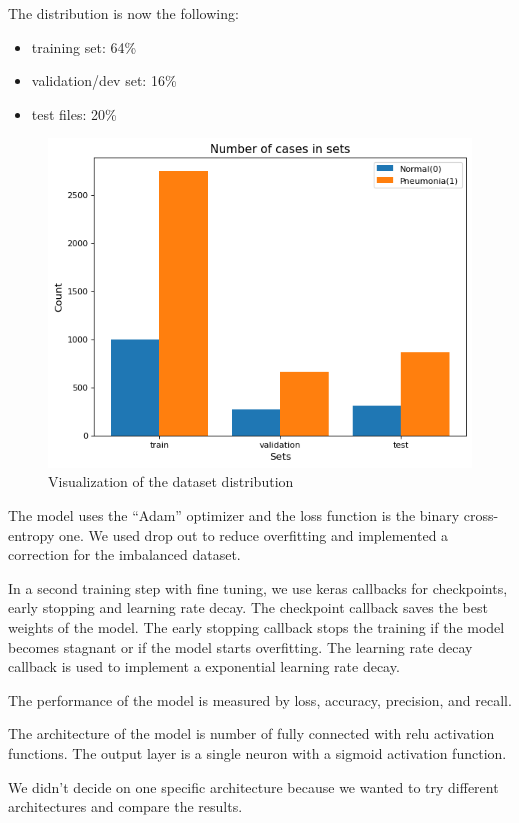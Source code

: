 \documentclass{article}
\begin{document}
The distribution is now the following:
\begin{itemize}
  \item training set: 64\%
  \item validation/dev set: 16\%
  \item test files: 20\%
\end{itemize}

\begin{figure}[ht]
  \centering
  \includegraphics[width=0.8\linewidth]{images/datasetVisualization.png}
  \caption{Visualization of the dataset distribution}
  \label{fig:tensorflow_dataset_distribution}
\end{figure}

The model uses the ``Adam'' optimizer and the loss function is the binary cross-entropy one.
We used drop out to reduce overfitting and implemented a correction for the imbalanced dataset.

In a second training step with fine tuning, we use keras callbacks for checkpoints, 
early stopping and learning rate decay.
The checkpoint callback saves the best weights of the model. 
The early stopping callback stops the training if the model becomes stagnant or if the model starts overfitting. 
The learning rate decay callback is used to implement a exponential learning rate decay.

The performance of the model is measured by loss, accuracy, precision, and recall.

The architecture of the model is number of fully connected with relu activation functions.
The output layer is a single neuron with a sigmoid activation function.

We didn't decide on one specific architecture because we wanted to try different architectures and 
compare the results.
\end{document}
